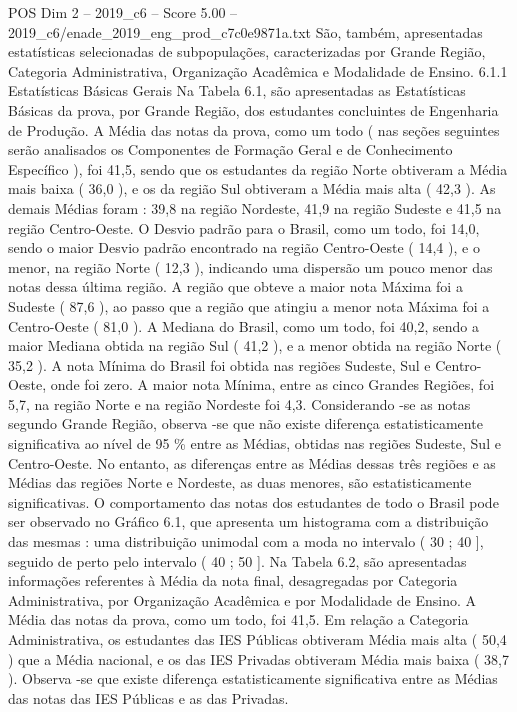 \begin{textsample}{POS Dim 2 – 2019\_c6 – Score 5.00 – 2019\_c6/enade\_2019\_eng\_prod\_c7c0e9871a.txt}
São, também, apresentadas estatísticas selecionadas de subpopulações, caracterizadas por Grande Região, Categoria Administrativa, Organização Acadêmica e Modalidade de Ensino. 6.1.1 Estatísticas Básicas Gerais Na Tabela 6.1, são apresentadas as Estatísticas Básicas da prova, por Grande Região, dos estudantes concluintes de Engenharia de Produção.
A Média das notas da prova, como um todo ( nas seções seguintes serão analisados os Componentes de Formação Geral e de Conhecimento Específico ), foi 41,5, sendo que os estudantes da região Norte obtiveram a Média mais baixa ( 36,0 ), e os da região Sul obtiveram a Média mais alta ( 42,3 ).
As demais Médias foram : 39,8 na região Nordeste, 41,9 na região Sudeste e 41,5 na região Centro-Oeste.
O Desvio padrão para o Brasil, como um todo, foi 14,0, sendo o maior Desvio padrão encontrado na região Centro-Oeste ( 14,4 ), e o menor, na região Norte ( 12,3 ), indicando uma dispersão um pouco menor das notas dessa última região.
A região que obteve a maior nota Máxima foi a Sudeste ( 87,6 ), ao passo que a região que atingiu a menor nota Máxima foi a Centro-Oeste ( 81,0 ).
A Mediana do Brasil, como um todo, foi 40,2, sendo a maior Mediana obtida na região Sul ( 41,2 ), e a menor obtida na região Norte ( 35,2 ).
A nota Mínima do Brasil foi obtida nas regiões Sudeste, Sul e Centro-Oeste, onde foi zero.
A maior nota Mínima, entre as cinco Grandes Regiões, foi 5,7, na região Norte e na região Nordeste foi 4,3.
Considerando -se as notas segundo Grande Região, observa -se que não existe diferença estatisticamente significativa ao nível de 95 \% entre as Médias, obtidas nas regiões Sudeste, Sul e Centro-Oeste.
No entanto, as diferenças entre as Médias dessas três regiões e as Médias das regiões Norte e Nordeste, as duas menores, são estatisticamente significativas.
O comportamento das notas dos estudantes de todo o Brasil pode ser observado no Gráfico 6.1, que apresenta um histograma com a distribuição das mesmas : uma distribuição unimodal com a moda no intervalo ( 30 ; 40 ], seguido de perto pelo intervalo ( 40 ; 50 ].
Na Tabela 6.2, são apresentadas informações referentes à Média da nota final, desagregadas por Categoria Administrativa, por Organização Acadêmica e por Modalidade de Ensino.
A Média das notas da prova, como um todo, foi 41,5.
Em relação a Categoria Administrativa, os estudantes das IES Públicas obtiveram Média mais alta ( 50,4 ) que a Média nacional, e os das IES Privadas obtiveram Média mais baixa ( 38,7 ).
Observa -se que existe diferença estatisticamente significativa entre as Médias das notas das IES Públicas e as das Privadas.

\end{textsample}
